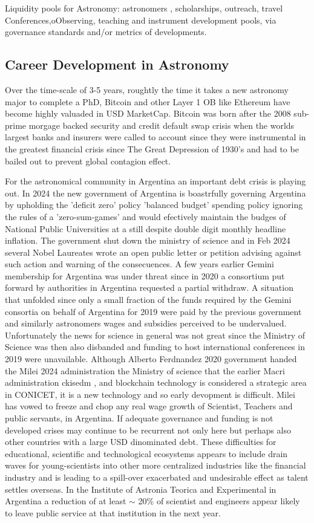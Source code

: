 \documentclass[final,5p,times,twocolumn,authoryear]{elsarticle}
\begin{document}
Liquidity pools for Astronomy: astronomers , scholarships, outreach, travel Conferences,oObserving, teaching and instrument development pools, via governance standards and/or metrics of developments. 

\subsection{Career Development in Astronomy}

Over the time-scale of 3-5 years, roughtly the time it takes a new astronomy major to complete a PhD, Bitcoin and other Layer 1 OB like Ethereum have become highly valuaded in USD MarketCap. Bitcoin was born after the 2008 sub-prime morgage backed security and credit default swap crisis when the worlds largest banks and insurers were called to account since they were instrumental in the greatest financial crisis since The Great Depression of 1930's and had to be bailed out to prevent global contagion effect.
 
For the astronomical community in Argentina an important debt crisis is playing out. In 2024 the new government of Argentina is boastrfully governing Argentina  by upholding the 'deficit zero' policy 'balanced budget' spending policy ignoring the rules of a 'zero-sum-games' and would efectively maintain the budges of National Public Universities at a still despite double digit monthly headline inflation. The government shut down the ministry of science and in Feb 2024 several Nobel Laureates wrote an open public letter or petition advising against such action and warning of the consecuences. A few years earlier Gemini membership for Argentina was under threat since in 2020 a consortium put forward by authorities in Argentina requested a partial withdraw. A situation that unfolded since only a small fraction of the funds required by the Gemini consortia on behalf of Argentina for 2019 were paid by the previous government and similarly astronomers wages and subsidies perceived to be undervalued. Unfortunately the news for science in general was not great since the Ministry of Science was then also disbanded and funding to host international conferences in 2019 were unavailable. Although Alberto Ferdnandez 2020 government handed the Milei 2024 administration the Ministry of science that the earlier Macri administration ckisedm , and blockchain technology is considered a strategic area in CONICET, it is a new technology and so early devopment is difficult. Milei has vowed to freeze and chop any real wage growth of Scientist, Teachers and public servants, in Argentina. If adequate governance and funding is not developed crises may continue to be recurrent not only here but perhaps also other countries with a large USD dinominated debt. These difficulties for educational, scientific and technological ecosystems appears to include drain waves for young-scientists into other more centralized industries like the financial industry and is leading to a spill-over exacerbated and undesirable effect as talent settles overseas. In the Institute of Astronia Teorica and Experimental in Argentina a reduction of at least $\sim$ 20\% of scientist and engineers appear likely to leave public service at that institution in the next year.
\end{document}
